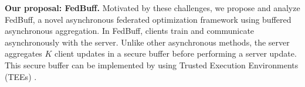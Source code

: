 \documentclass[twoside]{article}
\newcommand{\john}[1]{\todo[color=yellow!20,size=\footnotesize,inline,caption={}]{JN: #1}{}}
\newcommand{\algname}{{FedBuff}\xspace}
\begin{document}



\textbf{Our proposal: \algname{}.} Motivated by these challenges, we propose and analyze \algname, a novel asynchronous federated optimization framework using buffered asynchronous aggregation. In \algname, clients train and communicate asynchronously with the server. Unlike other asynchronous methods, the server aggregates $K$ client updates in a secure buffer before performing a server update. This secure buffer can be implemented by using Trusted Execution Environments (TEEs) \citep{secagg-sgx, tee_ppfl}. 


\end{document}

